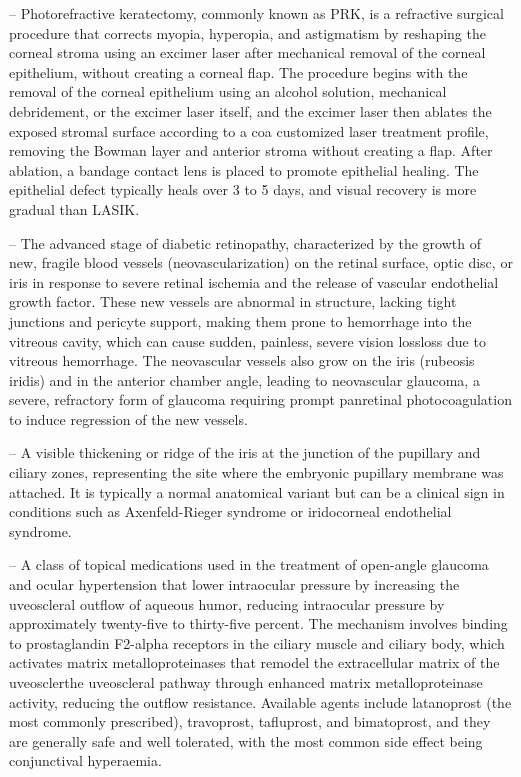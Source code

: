 -- Photorefractive keratectomy, commonly known as PRK, is a refractive surgical procedure that corrects myopia, hyperopia, and astigmatism by reshaping the corneal stroma using an excimer laser after mechanical removal of the corneal epithelium, without creating a corneal flap. The procedure begins with the removal of the corneal epithelium using an alcohol solution, mechanical debridement, or the excimer laser itself, and the excimer laser then ablates the exposed stromal surface according to a coa customized laser treatment profile, removing the Bowman layer and anterior stroma without creating a flap. After ablation, a bandage contact lens is placed to promote epithelial healing. The epithelial defect typically heals over 3 to 5 days, and visual recovery is more gradual than LASIK.

-- The advanced stage of diabetic retinopathy, characterized by the growth of new, fragile blood vessels (neovascularization) on the retinal surface, optic disc, or iris in response to severe retinal ischemia and the release of vascular endothelial growth factor. These new vessels are abnormal in structure, lacking tight junctions and pericyte support, making them prone to hemorrhage into the vitreous cavity, which can cause sudden, painless, severe vision lossloss due to vitreous hemorrhage. The neovascular vessels also grow on the iris (rubeosis iridis) and in the anterior chamber angle, leading to neovascular glaucoma, a severe, refractory form of glaucoma requiring prompt panretinal photocoagulation to induce regression of the new vessels.

-- A visible thickening or ridge of the iris at the junction of the pupillary and ciliary zones, representing the site where the embryonic pupillary membrane was attached. It is typically a normal anatomical variant but can be a clinical sign in conditions such as Axenfeld-Rieger syndrome or iridocorneal endothelial syndrome.

-- A class of topical medications used in the treatment of open-angle glaucoma and ocular hypertension that lower intraocular pressure by increasing the uveoscleral outflow of aqueous humor, reducing intraocular pressure by approximately twenty-five to thirty-five percent. The mechanism involves binding to prostaglandin F2-alpha receptors in the ciliary muscle and ciliary body, which activates matrix metalloproteinases that remodel the extracellular matrix of the uveosclerthe uveoscleral pathway through enhanced matrix metalloproteinase activity, reducing the outflow resistance. Available agents include latanoprost (the most commonly prescribed), travoprost, tafluprost, and bimatoprost, and they are generally safe and well tolerated, with the most common side effect being conjunctival hyperaemia.

